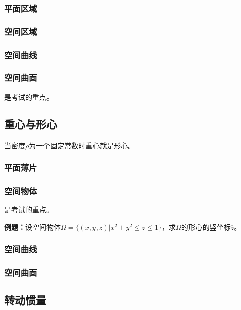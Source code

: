 \documentclass[UTF8, 12pt]{ctexart}
\begin{document}
\subsubsection{平面区域}

\subsubsection{空间区域}

\subsubsection{空间曲线}

\subsubsection{空间曲面}

是考试的重点。

\subsection{重心与形心}

当密度$\rho$为一个固定常数时重心就是形心。

\subsubsection{平面薄片}

\subsubsection{空间物体}

是考试的重点。

\textbf{例题：}设空间物体$\Omega=\{(x,y,z)|x^2+y^2\leqslant z\leqslant1\}$，求$\Omega$的形心的竖坐标$\overline{z}$。


\subsubsection{空间曲线}

\subsubsection{空间曲面}

\subsection{转动惯量}
\end{document}
